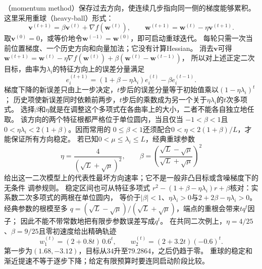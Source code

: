（momentum method）保存过去方向，使连续几步指向同一侧的梯度能够累积。
这里采用重球（heavy-ball）形式：
\[
  \bm{v}^{(t+1)}=\beta\bm{v}^{(t)}+\nabla f(\bm{w}^{(t)}),
  \qquad
  \bm{w}^{(t+1)}=\bm{w}^{(t)}-\eta\bm{v}^{(t+1)}.
\]
取$\bm v^{(0)}=0$，或等价地令$\bm w^{(-1)}=\bm w^{(0)}$，即可启动重球迭代。
每轮只需一次当前位置梯度、一个历史方向和向量加法；它没有计算Hessian。
消去$\bm v$可得$\bm w^{(t+1)}=\bm w^{(t)}-\eta\nabla f(\bm w^{(t)})
+\beta(\bm w^{(t)}-\bm w^{(t-1)})$，
所以对上述正定二次目标，曲率为$\lambda_i$的特征方向上的误差分量满足
\[
  e_i^{(t+1)}
  =(1+\beta-\eta\lambda_i)e_i^{(t)}-\beta e_i^{(t-1)}.
\]
梯度下降的新误差只由上一步决定，$t$步后的误差分量等于初始值乘以$(1-\eta\lambda_i)^t$；
历史项使新误差同时依赖前两步，$t$步后的乘数成为另一个关于$\eta\lambda_i$的$t$次多项式。
选择$\beta$和$\eta$就是在调整这个多项式在各曲率上的大小，二者不能各自独立地任取。
该方向的两个特征根都严格位于单位圆内，当且仅当
$-1<\beta<1$且$0<\eta\lambda_i<2(1+\beta)$。因而常用的
$0\leq\beta<1$还须配合$0<\eta<2(1+\beta)/L$，才能保证所有方向稳定。
若已知$0<\mu\leq\lambda_i\leq L$，经典重球参数
\[
  \eta=\frac{4}{(\sqrt{L}+\sqrt{\mu})^2},
  \qquad
  \beta=\left(\frac{\sqrt{L}-\sqrt{\mu}}
  {\sqrt{L}+\sqrt{\mu}}\right)^2
\]
给出这一二次模型上的代表性最坏方向速率；它不是一般非凸目标或含噪梯度下的无条件
调参规则。
稳定区间也可从特征多项式
$r^2-(1+\beta-\eta\lambda_i)r+\beta$核对：实系数二次多项式的两根在单位圆内，
等价于$|\beta|<1$、$\eta\lambda_i>0$与$2+2\beta-\eta\lambda_i>0$。
经典参数的根模至多
$q=(\sqrt L-\sqrt\mu)/(\sqrt L+\sqrt\mu)$，端点的重根会带来$tq^t$因子；
因此不能不带常数地把有限步参数误差写成$q^t$。
在共同二次例上，$\eta=4/25$、$\beta=9/25$且零初速度给出精确轨迹
\[
 w_1^{(t)}=(2+0.8t)\,0.6^t,\qquad
 w_2^{(t)}=(2+3.2t)(-0.6)^t.
\]
第一步为$(1.68,-3.12)$，目标从$34$升至$79.2864$，之后仍趋于零。
重球的稳定和渐近提速不等于逐步下降；给定有限预算时要连同启动阶段比较。

